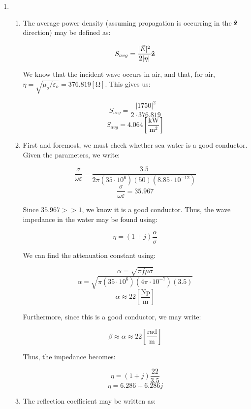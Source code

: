 \begin{enumerate}

  \item

    \begin{enumerate}

      \item 

        The average power density (assuming propagation is occurring in the $\bold{\hat{z}}$ direction) may be defined as:

        $$S_{avg}=\frac{|\vec{E}|^2}{2|\eta|}\bold{\hat{z}}$$

        We know that the incident wave occurs in air, and that, for air, $\eta=\sqrt{\mu_o/\varepsilon_o}=376.819[\si{\ohm}]$. This gives us:

        $$S_{avg}=\frac{|1750|^2}{2\cdot376.819}$$
        $$\boxed{S_{avg}=4.064\left[ \frac{\si{\kilo\watt}}{\si{\meter\squared}} \right]}$$

      \item 

        First and foremost, we must check whether sea water is a good conductor. Given the parameters, we write:

        $$\frac{\sigma}{\omega\varepsilon}=\frac{3.5}{2\pi(35\cdot10^6)(50)(8.85\cdot10^{-12})}$$
        $$\frac{\sigma}{\omega\varepsilon}=35.967$$

        Since $35.967>>1$, we know it is a good conductor. Thus, the wave impedance in the water may be found using:

        $$\eta=(1+j)\frac{\alpha}{\sigma}$$

        We can find the attenuation constant using:

        $$\alpha=\sqrt{\pi f\mu\sigma}$$
        $$\alpha=\sqrt{\pi(35\cdot10^6)(4\pi\cdot10^{-7})(3.5)}$$
        $$\alpha\approx 22\left[ \frac{\text{Np}}{\si{\meter}} \right]$$

        Furthermore, since this is a good conductor, we may write:

        $$\beta\approx\alpha\approx22\left[ \frac{\text{rad}}{\si{\meter}} \right]$$

        Thus, the impedance becomes:

        $$\eta=(1+j)\frac{22}{3.5}$$
        $$\boxed{\eta=6.286+6.286j}$$

      \item 

        The reflection coefficient may be written as:


\end{enumerate}
\end{enumerate}
